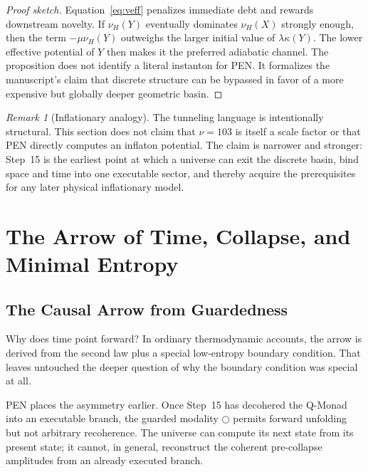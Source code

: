 \documentclass[11pt,a4paper]{article}
\theoremstyle{plain}
\theoremstyle{definition}
\theoremstyle{remark}
\newtheorem{remark}[theorem]{Remark}
\newcommand{\nextmod}{\bigcirc}
\begin{document}
\begin{proof}[Proof sketch]
Equation~\eqref{eq:veff} penalizes immediate debt and rewards downstream novelty.
If $\nu_H(Y)$ eventually dominates $\nu_H(X)$ strongly enough, then the term $-\mu\nu_H(Y)$ outweighs the larger initial value of $\lambda\kappa(Y)$.
The lower effective potential of $Y$ then makes it the preferred adiabatic channel.
The proposition does not identify a literal instanton for PEN.
It formalizes the manuscript's claim that discrete structure can be bypassed in favor of a more expensive but globally deeper geometric basin.
\end{proof}

\begin{remark}[Inflationary analogy]
\label{rem:inflation}
The tunneling language is intentionally structural.
This section does not claim that $\nu = 103$ is itself a scale factor or that PEN directly computes an inflaton potential.
The claim is narrower and stronger: Step~15 is the earliest point at which a universe can exit the discrete basin, bind space and time into one executable sector, and thereby acquire the prerequisites for any later physical inflationary model.
\end{remark}


\section{The Arrow of Time, Collapse, and Minimal Entropy}
\label{sec:arrow}

\subsection{The Causal Arrow from Guardedness}
\label{sec:causal-arrow}

Why does time point forward?
In ordinary thermodynamic accounts, the arrow is derived from the second law plus a special low-entropy boundary condition.
That leaves untouched the deeper question of why the boundary condition was special at all.

PEN places the asymmetry earlier.
Once Step~15 has decohered the Q-Monad into an executable branch, the guarded modality $\nextmod$ permits forward unfolding but not arbitrary recoherence.
The universe can compute its next state from its present state; it cannot, in general, reconstruct the coherent pre-collapse amplitudes from an already executed branch.
\end{document}
